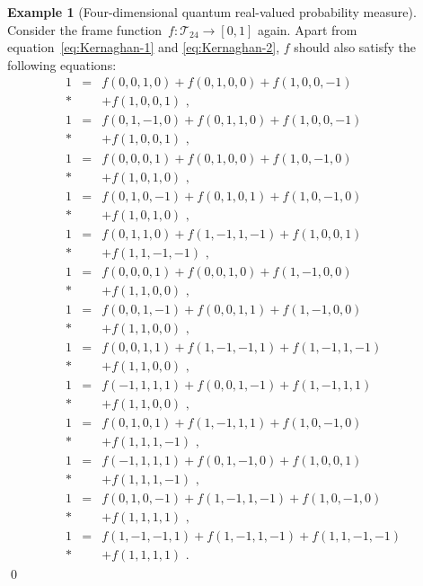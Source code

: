 \documentclass[english,reprint, aps, prl,superscriptaddress, showpacs,
showkeys]{revtex4-1}
\theoremstyle{plain}
\theoremstyle{definition}
\newtheorem{example}[thm]{Example}
\begin{document}
\begin{example}[Four-dimensional quantum real-valued probability
measure]\label{ex:four-dimensional-real-value}Consider the frame
function~$f:\mathcal{T}_{24}\rightarrow\left[0,1\right]$ again.
Apart from equation~\ref{eq:Kernaghan-1} and \ref{eq:Kernaghan-2},
$f$ should also satisfy the following equations: 
\begin{subequations}
\label{eq:non-Kernaghan}
\begin{eqnarray}
1 & = & f(0,0,1,0)+f(0,1,0,0)+f(1,0,0,-1) \nonumber \\*
  &   & +f(1,0,0,1)\textrm{ ,}\\ 
1 & = & f(0,1,-1,0)+f(0,1,1,0)+f(1,0,0,-1) \nonumber \\*
  &   & +f(1,0,0,1)\textrm{ ,}\\ 
1 & = & f(0,0,0,1)+f(0,1,0,0)+f(1,0,-1,0) \nonumber \\*
  &   & +f(1,0,1,0)\textrm{ ,}\\ 
1 & = & f(0,1,0,-1)+f(0,1,0,1)+f(1,0,-1,0) \nonumber \\*
  &   & +f(1,0,1,0)\textrm{ ,}\\ 
1 & = & f(0,1,1,0)+f(1,-1,1,-1)+f(1,0,0,1) \nonumber \\*
  &   & +f(1,1,-1,-1)\textrm{ ,}\\ 
1 & = & f(0,0,0,1)+f(0,0,1,0)+f(1,-1,0,0) \nonumber \\*
  &   & +f(1,1,0,0)\textrm{ ,}\\ 
1 & = & f(0,0,1,-1)+f(0,0,1,1)+f(1,-1,0,0) \nonumber \\*
  &   & +f(1,1,0,0)\textrm{ ,}\\ 
1 & = & f(0,0,1,1)+f(1,-1,-1,1)+f(1,-1,1,-1) \nonumber \\*
  &   & +f(1,1,0,0)\textrm{ ,}\\ 
1 & = & f(-1,1,1,1)+f(0,0,1,-1)+f(1,-1,1,1) \nonumber \\*
  &   & +f(1,1,0,0)\textrm{ ,}\\ 
1 & = & f(0,1,0,1)+f(1,-1,1,1)+f(1,0,-1,0) \nonumber \\*
  &   & +f(1,1,1,-1)\textrm{ ,}\\ 
1 & = & f(-1,1,1,1)+f(0,1,-1,0)+f(1,0,0,1) \nonumber \\*
  &   & +f(1,1,1,-1)\textrm{ ,}\\ 
1 & = & f(0,1,0,-1)+f(1,-1,1,-1)+f(1,0,-1,0) \nonumber \\*
  &   & +f(1,1,1,1)\textrm{ ,}\\ 
1 & = & f(1,-1,-1,1)+f(1,-1,1,-1)+f(1,1,-1,-1) \nonumber \\*
  &   & +f(1,1,1,1)\textrm{ .} 
\end{eqnarray}
\end{subequations}
\qed\end{example}
\end{document}
